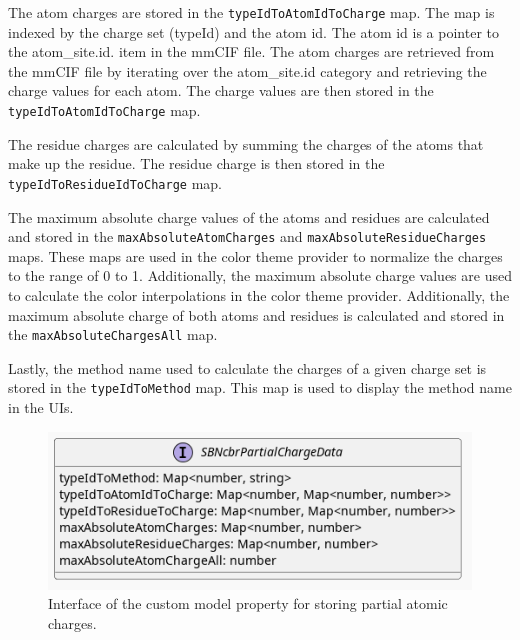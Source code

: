 \documentclass[
  digital,     %
  oneside,     %
  nosansbold,  %
  nocolorbold, %
  lof,         %
  lot,         %
]{fithesis4}
\begin{document}
The atom charges are stored in the \texttt{typeIdToAtomIdToCharge} map. The map is indexed by the charge set (typeId) and the atom id. The atom id is a pointer to the atom\_site.id. item in the mmCIF file. The atom charges are retrieved from the mmCIF file by iterating over the atom\_site.id category and retrieving the charge values for each atom. The charge values are then stored in the \texttt{typeIdToAtomIdToCharge} map.

The residue charges are calculated by summing the charges of the atoms that make up the residue. The residue charge is then stored in the \texttt{typeIdToResidueIdToCharge} map.

The maximum absolute charge values of the atoms and residues are calculated and stored in the \texttt{maxAbsoluteAtomCharges} and \texttt{maxAbsoluteResidueCharges} maps. These maps are used in the color theme provider to normalize the charges to the range of 0 to 1. Additionally, the maximum absolute charge values are used to calculate the color interpolations in the color theme provider. Additionally, the maximum absolute charge of both atoms and residues is calculated and stored in the \texttt{maxAbsoluteChargesAll} map.

Lastly, the method name used to calculate the charges of a given charge set is stored in the \texttt{typeIdToMethod} map. This map is used to display the method name in the UIs.

\begin{figure}[htbp]
  \begin{center}
    \includegraphics[width=\textwidth]{out/figures/uml/interface/custom model property interface.png}
  \end{center}
  \caption{Interface of the custom model property for storing partial atomic charges.}
  \label{fig:property_provider_interface}
\end{figure}
\end{document}
